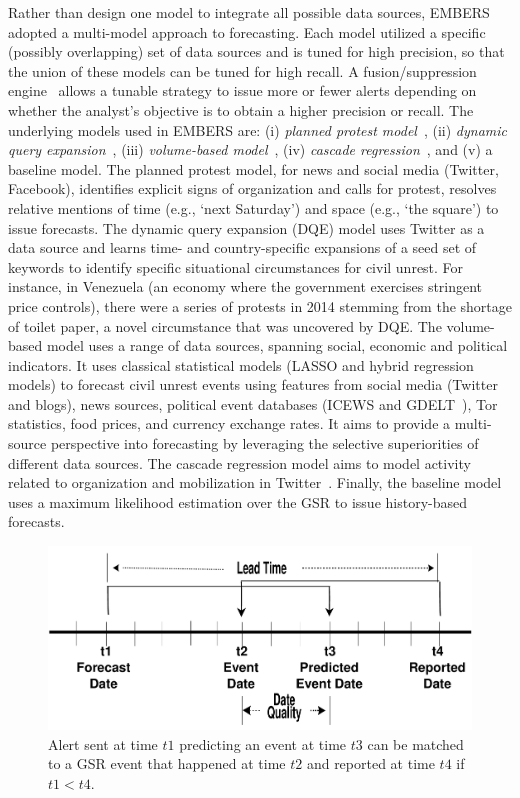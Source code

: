 Rather than design one model to integrate all possible data sources, EMBERS adopted a multi-model
approach to forecasting. Each model utilized a specific (possibly overlapping) set of data sources
and is tuned for high precision, so that the union of these models can be tuned for high recall.
A fusion/suppression engine~\cite{andy-scotland-paper} allows a tunable
strategy to issue more or fewer
alerts depending on whether the analyst's objective is to obtain a higher
precision or recall. The underlying models used in EMBERS are: (i)
\textit{planned protest model}~\cite{pp-paper1},
(ii) \textit{dynamic query expansion}~\cite{dqe-plosone}, (iii) \textit{volume-based model}~\cite{asonam},
(iv) \textit{cascade regression}~\cite{anil-plosone}, and (v) a baseline model. The planned protest model,
for news and social media (Twitter, Facebook), identifies explicit signs of organization and calls
for protest, resolves relative mentions of time (e.g., `next Saturday') and space (e.g., `the square')
to issue forecasts. The dynamic query expansion (DQE) model uses Twitter as a data source and learns time- and country-specific
expansions of a seed set of keywords to identify specific situational circumstances for civil unrest.
For instance, in Venezuela (an economy where the government exercises stringent price controls),
there were a series of protests in 2014 stemming from the shortage of toilet paper, a novel circumstance
that was uncovered by DQE. The volume-based model uses a range of data sources, spanning
social, economic
and political indicators. It uses classical statistical models (LASSO
and hybrid regression models) to forecast civil unrest events using features
from social media (Twitter and blogs), news sources,
political event databases (ICEWS and GDELT~\cite{gdelt}), Tor~\cite{tor} statistics, food prices, and currency
exchange rates. It aims to provide a multi-source perspective into forecasting by leveraging
the selective superiorities of different data sources.  The cascade regression model
aims to model activity related to organization and mobilization in Twitter~\cite{anil-plosone}.
Finally, the baseline model uses a maximum likelihood
estimation over the GSR to issue history-based forecasts.

\begin{figure}
\includegraphics[width=\columnwidth]{figures/cu/timeline.pdf}
\caption{Alert sent at time $t1$ predicting an event at time $t3$
can be matched to a GSR event that happened at time $t2$ and reported
at time $t4$ if $t1 < t4$.}
\label{fig:leadtime}
\end{figure}

